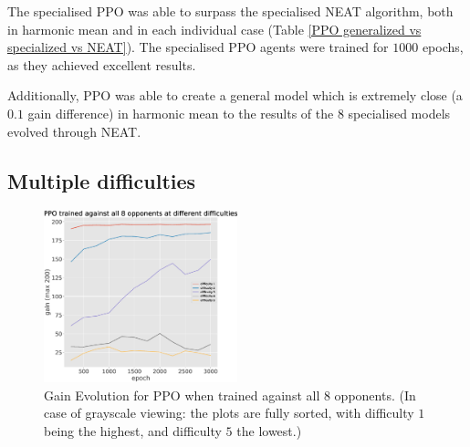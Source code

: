 \documentclass[conference]{IEEEtran}
\begin{document}
    The specialised PPO was able to surpass the specialised NEAT\cite{evoman} algorithm, both in harmonic mean and in each individual case (Table \ref{PPO generalized vs specialized vs NEAT}). The specialised PPO agents were trained for $1000$ epochs, as they achieved excellent results.

    Additionally, PPO was able to create a general model which is extremely close (a $0.1$ gain difference) in harmonic mean to the results of the $8$ specialised models evolved through NEAT.
    
    \subsection{Multiple difficulties}

    \begin{figure}[htbp]
    \centering
    \includegraphics[width=0.5\textwidth]{images/general_harmonic_gain.eps}
    \caption{Gain Evolution for PPO when trained against all 8 opponents. (In case of grayscale viewing: the plots are fully sorted, with difficulty $1$ being the highest, and difficulty $5$ the lowest.)}
    \label{fig:ppo_train_8}
    \end{figure}
\end{document}
